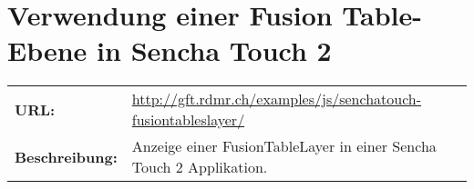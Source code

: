 \section{Verwendung einer Fusion Table-Ebene in Sencha Touch 2}
\begin{tabular}{p{0.2\twocelltabwidth}p{0.8\twocelltabwidth}}
\textbf{URL:} & \url{http://gft.rdmr.ch/examples/js/senchatouch-fusiontableslayer/} \\ 
\textbf{Beschreibung:} & Anzeige einer FusionTableLayer in einer Sencha Touch 2 Applikation. \\ 
\end{tabular} 